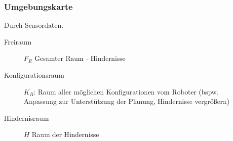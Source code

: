 \subsubsection{Umgebungskarte}

Durch Sensordaten.

\begin{description}
	\item[Freiraum] $F_R$ Gesamter Raum - Hindernisse
	\item[Konfigurationsraum] $K_R$: Raum aller möglichen Konfigurationen vom Roboter (bspw. Anpassung zur Unterstützung der Planung, Hindernisse vergrößern)
	\item[Hindernisraum] $H$ Raum der Hindernisse
\end{description}

%
